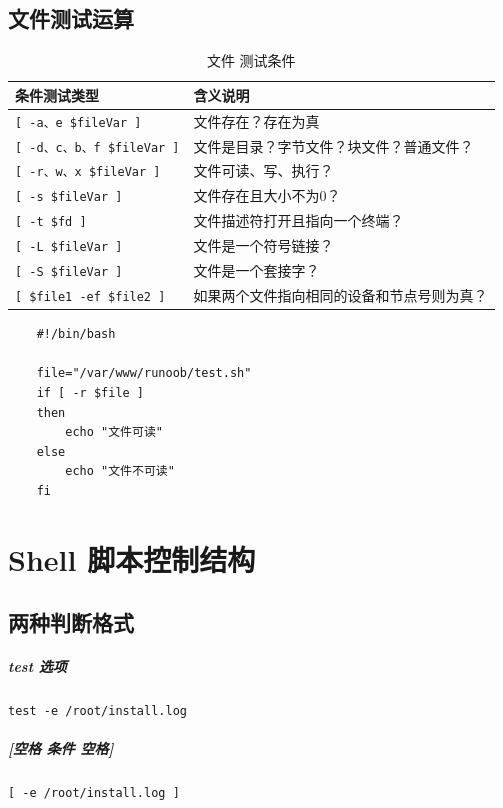 \documentclass[UTF8,a4paper,12pt]{ctexbook}
\begin{document}
		\section{文件测试运算}
			\begin{table}[H]
				\centering
				\caption{文件 测试条件}
				\begin{tabular}{p{5cm}<{\centering} | p{10cm}<{\centering}}
					\toprule
						条件测试类型 & 含义说明\\
					\midrule
						\verb|[ -a、e $fileVar ]| &  文件存在？存在为真\\
						\verb|[ -d、c、b、f $fileVar ]| &  文件是目录？字节文件？块文件？普通文件？\\
						\verb|[ -r、w、x $fileVar ]| &  文件可读、写、执行？\\
						\verb|[ -s $fileVar ]| &  文件存在且大小不为0？\\
						\verb|[ -t $fd ]| &  文件描述符打开且指向一个终端？\\
						\verb|[ -L $fileVar ]| &  文件是一个符号链接？\\
						\verb|[ -S $fileVar ]| &  文件是一个套接字？\\
						\verb|[ $file1 -ef $file2 ]| &  如果两个文件指向相同的设备和节点号则为真？\\
					\bottomrule
				\end{tabular}
			\end{table}
		
			\begin{lstlisting}
	#!/bin/bash

	file="/var/www/runoob/test.sh"
	if [ -r $file ]
	then
		echo "文件可读"
	else
		echo "文件不可读"
	fi
			\end{lstlisting} 
			 
	 
\chapter{Shell 脚本控制结构}
	\section{两种判断格式}
		\paragraph{test 选项}\verb|test -e /root/install.log|
		
		\paragraph{[空格 条件 空格]}\verb|[ -e /root/install.log ]|
		
\end{document}
